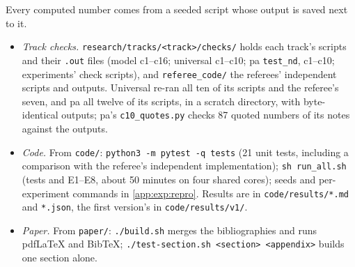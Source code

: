 Every computed number comes from a seeded script whose output is saved next to it.
\begin{itemize}[leftmargin=*]
\item \emph{Track checks.} \texttt{research/tracks/<track>/checks/} holds each track's scripts and their \texttt{.out} files (model c1--c16; universal c1--c10; pa \texttt{test\_nd}, c1--c10; experiments' check scripts), and \texttt{referee\_code/} the referees' independent scripts and outputs. Universal re-ran all ten of its scripts and the referee's seven, and pa all twelve of its scripts, in a scratch directory, with byte-identical outputs; pa's \texttt{c10\_quotes.py} checks 87 quoted numbers of its notes against the outputs.
\item \emph{Code.} From \texttt{code/}: \texttt{python3 -m pytest -q tests} (21 unit tests, including a comparison with the referee's independent implementation); \texttt{sh run\_all.sh} (tests and E1--E8, about 50 minutes on four shared cores); seeds and per-experiment commands in \cref{app:exp:repro}. Results are in \texttt{code/results/*.md} and \texttt{*.json}, the first version's in \texttt{code/results/v1/}.
\item \emph{Paper.} From \texttt{paper/}: \texttt{./build.sh} merges the bibliographies and runs pdf\LaTeX{} and Bib\TeX; \texttt{./test-section.sh <section> <appendix>} builds one section alone.
\end{itemize}
